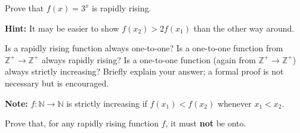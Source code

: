 \documentclass[12pt]{exam}
\begin{document}
\begin{qparts}
    \item Prove that $f(x) = 3^x$ is rapidly rising.

    \textbf{Hint:} It may be easier to show $f(x_2) > 2f(x_1)$ than the other way around.
    
    \item Is a rapidly rising function always one-to-one? Is a one-to-one function from $\mathbb{Z}^+\to\mathbb{Z}^+$ always rapidly rising? Is a one-to-one function (again from $\mathbb{Z}^+\to\mathbb{Z}^+$) always strictly increasing? Briefly explain your answer; a formal proof is not necessary but is encouraged.

    \textbf{Note:} $f\colon\mathbb{N}\to\mathbb{N}$ is strictly increasing if $f(x_1)<f(x_2)$ whenever $x_1<x_2.$
    \item Prove that, for any rapidly rising function $f$, it must \textbf{not} be onto.
\end{qparts}
\end{document}
